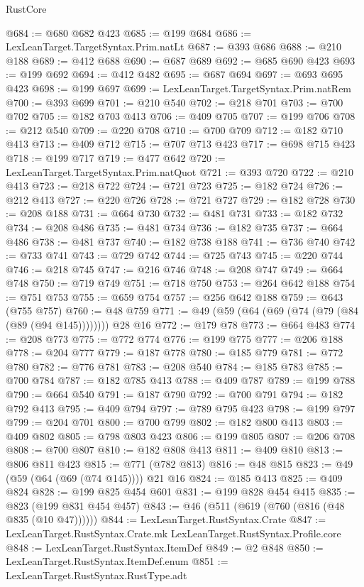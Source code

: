 \begin{lexlean}{RustCore}
\begin{coremodule}
@684 := @680 @682 @423
@685 := @199 @684
@686 := LexLeanTarget.TargetSyntax.Prim.natLt
@687 := @393 @686
@688 := @210 @188
@689 := @412 @688
@690 := @687 @689
@692 := @685 @690 @423
@693 := @199 @692
@694 := @412 @482
@695 := @687 @694
@697 := @693 @695 @423
@698 := @199 @697
@699 := LexLeanTarget.TargetSyntax.Prim.natRem
@700 := @393 @699
@701 := @210 @540
@702 := @218 @701
@703 := @700 @702
@705 := @182 @703 @413
@706 := @409 @705
@707 := @199 @706
@708 := @212 @540
@709 := @220 @708
@710 := @700 @709
@712 := @182 @710 @413
@713 := @409 @712
@715 := @707 @713 @423
@717 := @698 @715 @423
@718 := @199 @717
@719 := @477 @642
@720 := LexLeanTarget.TargetSyntax.Prim.natQuot
@721 := @393 @720
@722 := @210 @413
@723 := @218 @722
@724 := @721 @723
@725 := @182 @724
@726 := @212 @413
@727 := @220 @726
@728 := @721 @727
@729 := @182 @728
@730 := @208 @188
@731 := @664 @730
@732 := @481 @731
@733 := @182 @732
@734 := @208 @486
@735 := @481 @734
@736 := @182 @735
@737 := @664 @486
@738 := @481 @737
@740 := @182 @738 @188
@741 := @736 @740
@742 := @733 @741
@743 := @729 @742
@744 := @725 @743
@745 := @220 @744
@746 := @218 @745
@747 := @216 @746
@748 := @208 @747
@749 := @664 @748
@750 := @719 @749
@751 := @718 @750
@753 := @264 @642 @188
@754 := @751 @753
@755 := @659 @754
@757 := @256 @642 @188
@759 := @643 (@755 @757)
@760 := @48 @759
@771 := @49 (@59 (@64 (@69 (@74 (@79 (@84 (@89 (@94 @145)))))))) @28 @16
@772 := @179 @78
@773 := @664 @483
@774 := @208 @773
@775 := @772 @774
@776 := @199 @775
@777 := @206 @188
@778 := @204 @777
@779 := @187 @778
@780 := @185 @779
@781 := @772 @780
@782 := @776 @781
@783 := @208 @540
@784 := @185 @783
@785 := @700 @784
@787 := @182 @785 @413
@788 := @409 @787
@789 := @199 @788
@790 := @664 @540
@791 := @187 @790
@792 := @700 @791
@794 := @182 @792 @413
@795 := @409 @794
@797 := @789 @795 @423
@798 := @199 @797
@799 := @204 @701
@800 := @700 @799
@802 := @182 @800 @413
@803 := @409 @802
@805 := @798 @803 @423
@806 := @199 @805
@807 := @206 @708
@808 := @700 @807
@810 := @182 @808 @413
@811 := @409 @810
@813 := @806 @811 @423
@815 := @771 (@782 @813)
@816 := @48 @815
@823 := @49 (@59 (@64 (@69 (@74 @145)))) @21 @16
@824 := @185 @413
@825 := @409 @824
@828 := @199 @825 @454 @601
@831 := @199 @828 @454 @415
@835 := @823 (@199 @831 @454 @457)
@843 := @46 (@511 (@619 (@760 (@816 (@48 @835 (@10 @47))))))
@844 := LexLeanTarget.RustSyntax.Crate
@847 := LexLeanTarget.RustSyntax.Crate.mk LexLeanTarget.RustSyntax.Profile.core
@848 := LexLeanTarget.RustSyntax.ItemDef
@849 := @2 @848
@850 := LexLeanTarget.RustSyntax.ItemDef.enum
@851 := LexLeanTarget.RustSyntax.RustType.adt

\end{coremodule}
\end{lexlean}
